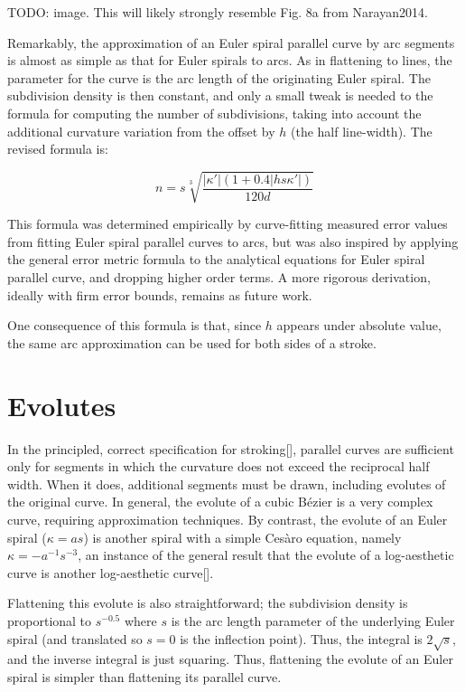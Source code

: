 \documentclass[sigconf, authordraft]{acmart}
\begin{document}
TODO: image. This will likely strongly resemble Fig. 8a from Narayan2014.

Remarkably, the approximation of an Euler spiral parallel curve by arc segments is almost as simple as that for Euler spirals to arcs. As in flattening to lines, the parameter for the curve is the arc length of the originating Euler spiral. The subdivision density is then constant, and only a small tweak is needed to the formula for computing the number of subdivisions, taking into account the additional curvature variation from the offset by $h$ (the half line-width). The revised formula is:

\[
    n = s\sqrt[3]{\frac{|\kappa'|(1+0.4|hs\kappa'|)}{120d}}
\]

This formula was determined empirically by curve-fitting measured error values from fitting Euler spiral parallel curves to arcs, but was also inspired by applying the general error metric formula to the analytical equations for Euler spiral parallel curve, and dropping higher order terms. A more rigorous derivation, ideally with firm error bounds, remains as future work.

One consequence of this formula is that, since $h$ appears under absolute value, the same arc approximation can be used for both sides of a stroke.


\section{Evolutes}

In the principled, correct specification for stroking[], parallel curves are sufficient only for segments in which the curvature does not exceed the reciprocal half width. When it does, additional segments must be drawn, including evolutes of the original curve. In general, the evolute of a cubic Bézier is a very complex curve, requiring approximation techniques. By contrast, the evolute of an Euler spiral ($\kappa = as$) is another spiral with a simple Cesàro equation, namely $\kappa = -a^{-1}s^{-3}$, an instance of the general result that the evolute of a log-aesthetic curve is another log-aesthetic curve[].

Flattening this evolute is also straightforward; the subdivision density is proportional to $s^{-0.5}$ where $s$ is the arc length parameter of the underlying Euler spiral (and translated so $s = 0$ is the inflection point). Thus, the integral is $2\sqrt{s}$, and the inverse integral is just squaring. Thus, flattening the evolute of an Euler spiral is simpler than flattening its parallel curve.
\end{document}

